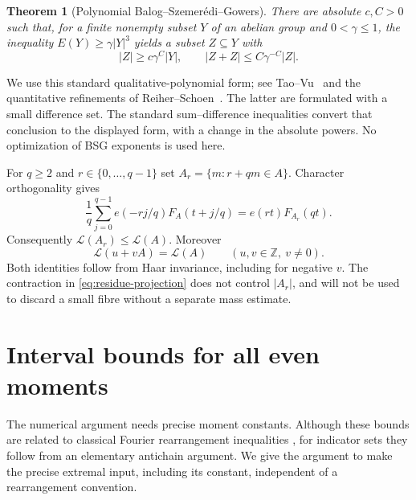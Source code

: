 \documentclass[11pt,reqno]{amsart}
\numberwithin{equation}{section}
\newtheorem{theorem}{Theorem}[section]
\theoremstyle{definition}
\theoremstyle{remark}
\newcommand{\Z}{\mathbb Z}
\newcommand{\La}{\mathcal L}
\begin{document}
\begin{theorem}[Polynomial Balog--Szemer\'edi--Gowers]\label{thm:BSG}
There are absolute $c,C>0$ such that, for a finite nonempty subset $Y$ of
an abelian group and $0<\gamma\le1$, the inequality
$E(Y)\ge\gamma|Y|^3$ yields a subset $Z\subseteq Y$ with
\[
 |Z|\ge c\gamma^C|Y|,
 \qquad |Z+Z|\le C\gamma^{-C}|Z|.
\]
\end{theorem}
We use this standard qualitative-polynomial form; see
Tao--Vu~\cite[Theorem 2.31]{TaoVu} and the quantitative refinements of
Reiher--Schoen~\cite{ReiherSchoen}. The latter are formulated with a
small difference set. The standard sum--difference inequalities convert
that conclusion to the displayed form, with a change in the absolute
powers. No optimization of BSG exponents is used here.

For $q\ge2$ and $r\in\{0,\ldots,q-1\}$ set
$A_r=\{m:r+qm\in A\}$. Character orthogonality gives
\begin{equation}\label{eq:residue-projection}
 \frac1q\sum_{j=0}^{q-1}e(-rj/q)F_A(t+j/q)
   =e(rt)F_{A_r}(qt).
\end{equation}
Consequently $\La(A_r)\le\La(A)$. Moreover
\begin{equation}\label{eq:affine-invariance}
 \La(u+vA)=\La(A)\qquad(u,v\in\Z,\ v\ne0).
\end{equation}
Both identities follow from Haar invariance, including for negative
$v$. The contraction in \eqref{eq:residue-projection} does not control
$|A_r|$, and will not be used to discard a small fibre without a separate
mass estimate.

\section{Interval bounds for all even moments}\label{sec:moments}

The numerical argument needs precise moment constants. Although these
bounds are related to classical Fourier rearrangement inequalities
\cite{Gabriel,HardyLittlewood}, for indicator sets they follow from an
elementary antichain argument. We give the argument to make the precise
extremal input, including its constant, independent of a rearrangement
convention.
\end{document}
